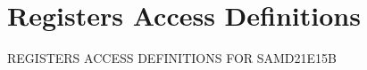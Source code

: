 \hypertarget{group___s_a_m_d21_e15_b__reg}{}\section{Registers Access Definitions}
\label{group___s_a_m_d21_e15_b__reg}
R\+E\+G\+I\+S\+T\+E\+RS A\+C\+C\+E\+SS D\+E\+F\+I\+N\+I\+T\+I\+O\+NS F\+OR S\+A\+M\+D21\+E15B 